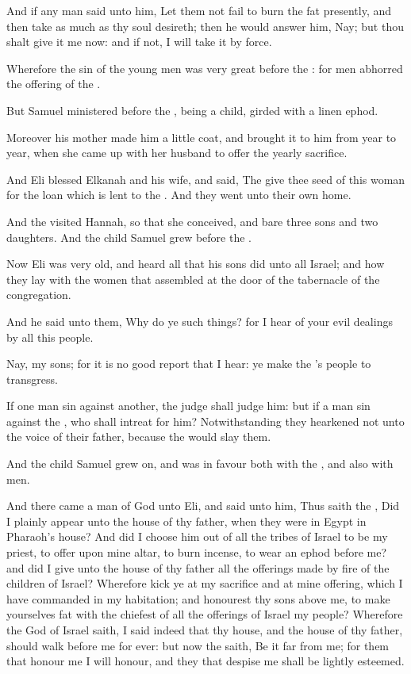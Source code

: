 \Verse And if any man said unto him, Let them not fail to burn the fat presently, and then take as much as thy soul desireth; then he would answer him, Nay; but thou shalt give it me now: and if not, I will take it by force.

\Verse Wherefore the sin of the young men was very great before the \LORD: for men abhorred the offering of the \LORD.

\Verse But Samuel ministered before the \LORD, being a child, girded with a linen ephod.

\Verse Moreover his mother made him a little coat, and brought it to him from year to year, when she came up with her husband to offer the yearly sacrifice.

\Verse And Eli blessed Elkanah and his wife, and said, The \LORD give thee seed of this woman for the loan which is lent to the \LORD. And they went unto their own home.

\Verse And the \LORD visited Hannah, so that she conceived, and bare three sons and two daughters. And the child Samuel grew before the \LORD.

\Verse Now Eli was very old, and heard all that his sons did unto all Israel; and how they lay with the women that assembled at the door of the tabernacle of the congregation.

\Verse And he said unto them, Why do ye such things? for I hear of your evil dealings by all this people.

\Verse Nay, my sons; for it is no good report that I hear: ye make the \LORD's people to transgress.

\Verse If one man sin against another, the judge shall judge him: but if a man sin against the \LORD, who shall intreat for him? Notwithstanding they hearkened not unto the voice of their father, because the \LORD would slay them.

\Verse And the child Samuel grew on, and was in favour both with the \LORD, and also with men.

\Verse And there came a man of God unto Eli, and said unto him, Thus saith the \LORD, Did I plainly appear unto the house of thy father, when they were in Egypt in Pharaoh's house?  \Verse And did I choose him out of all the tribes of Israel to be my priest, to offer upon mine altar, to burn incense, to wear an ephod before me? and did I give unto the house of thy father all the offerings made by fire of the children of Israel?  \Verse Wherefore kick ye at my sacrifice and at mine offering, which I have commanded in my habitation; and honourest thy sons above me, to make yourselves fat with the chiefest of all the offerings of Israel my people?  \Verse Wherefore the \LORD God of Israel saith, I said indeed that thy house, and the house of thy father, should walk before me for ever: but now the \LORD saith, Be it far from me; for them that honour me I will honour, and they that despise me shall be lightly esteemed.

